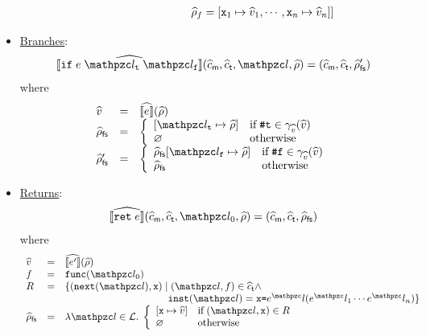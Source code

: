 \begin{itemize}
\[\begin{array}{l@{~}c@{~}ll}
        \phantom{[\lab_\func \mapsto \aenv_\func \mid \;}
        \aenv_\func = [\varx_1 \mapsto \aval_1, \cdots,
        \varx_n \mapsto \aval_n] ]\\
      \end{array}
    \]

  \item \underline{Branches}:
    \[
      \asem{\kwif \; \expr \; \lab_\vart \; \lab_\varf}(\amctxt, \atctxt, \lab, \aenv) =
      (\amctxt, \atctxt, \afsenv')
    \]
    where
    \[
      \begin{array}{lcl}
        \aval &=& \asem{\expr}(\aenv)\\

        \afsenv &=& \left\{
          \begin{array}{ll}
            [\lab_\vart \mapsto \aenv] & \text{if} \; \true \in
            \avalgamma(\aval)\\
            \varnothing & \text{otherwise}\\
          \end{array}
        \right.\\

        \afsenv' &=& \left\{
          \begin{array}{ll}
            \afsenv[\lab_\varf \mapsto \aenv] & \text{if} \; \false \in
            \avalgamma(\aval)\\
            \afsenv & \text{otherwise}\\
          \end{array}
        \right.\\
      \end{array}
    \]

  \item \underline{Returns}:
    \[
      \asem{\kwret \; \expr}(\amctxt, \atctxt, \lab_0, \aenv) =
      (\amctxt, \atctxt, \afsenv)
    \]
    where
    \[
      \begin{array}{lcl}
        \aval &=& \asem{\expr'}(\aenv)\\

        \func &=& \getfunc(\lab_0)\\
        R &=& \{ (\getnext(\lab), \varx) \mid
          (\lab, \func) \in \atctxt \wedge\\

          && \phantom{\{ (\getnext(\lab), \varx) \mid}
          \getinst(\lab) = \varx \kweq \expr^\lab (\expr^\lab_1 \cdots \expr^\lab_n)
        \}\\

        \afsenv &=& \lambda \lab \in \labset. \; \left\{
          \begin{array}{ll}
            [\varx \mapsto \aval]
            & \text{if} \; (\lab, \varx) \in R\\

            \varnothing
            & \text{otherwise}\\
          \end{array}
        \right.\\
      \end{array}
    \]
\end{itemize}


